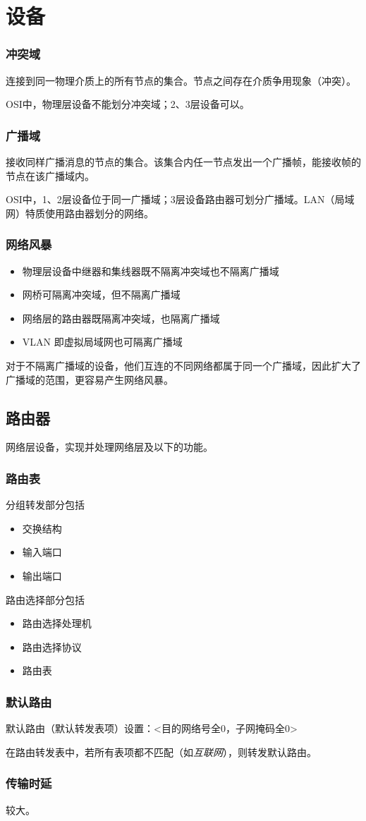 
\chapter{设备}


\subsection{冲突域}
连接到同一物理介质上的所有节点的集合。节点之间存在介质争用现象（冲突）。

OSI中，物理层设备不能划分冲突域；2、3层设备可以。


\subsection{广播域}
接收同样广播消息的节点的集合。该集合内任一节点发出一个广播帧，能接收帧的节点在该广播域内。

OSI中，1、2层设备位于同一广播域；3层设备路由器可划分广播域。LAN（局域网）特质使用路由器划分的网络。


\subsection{网络风暴}
\begin{itemize}
    \item 物理层设备中继器和集线器既不隔离冲突域也不隔离广播域
    \item 网桥可隔离冲突域，但不隔离广播域
    \item 网络层的路由器既隔离冲突域，也隔离广播域
    \item VLAN 即虚拟局域网也可隔离广播域
\end{itemize}
对于不隔离广播域的设备，他们互连的不同网络都属于同一个广播域，因此扩大了广播域的范围，更容易产生网络风暴。


\section{路由器}\label{路由器}
网络层设备，实现并处理网络层及以下的功能。

\subsection{路由表}
分组转发部分包括\begin{itemize}
    \item 交换结构
    \item 输入端口
    \item 输出端口
\end{itemize}

路由选择部分包括\begin{itemize}
    \item 路由选择处理机
    \item 路由选择协议
    \item 路由表
\end{itemize}

\subsection{默认路由}\label{默认路由}
默认路由（默认转发表项）设置：<目的网络号全0，子网掩码全0>

在路由转发表中，若所有表项都不匹配（如\textit{互联网}），则转发默认路由。


\subsection{传输时延}
较大。



